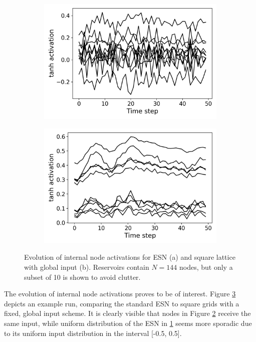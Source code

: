 \begin{figure}[htb]
  \centering
  \begin{subfigure}{.49\textwidth}
    \centering
    \includegraphics[width=1.0\linewidth]{figures/esn-activations.png}
    \caption{}
    \label{fig:activations-a}
  \end{subfigure}
  \begin{subfigure}{.49\textwidth}
    \centering
    \includegraphics[width=1.0\linewidth]{figures/sq-activations.png}
    \caption{}
    \label{fig:activations-b}
  \end{subfigure}
  \caption{
    Evolution of internal node activations for ESN (a) and square lattice with
global input (b). Reservoirs contain $N = 144$ nodes, but only a subset of 10 is
shown to avoid clutter.
  }
  \label{fig:activations}
\end{figure}

The evolution of internal node activations proves to be of interest. Figure
\ref{fig:activations} depicts an example run, comparing the standard ESN to
square grids with a fixed, global input scheme. It is clearly visible that nodes
in Figure \ref{fig:activations-b} receive the same input, while uniform
distribution of the ESN in \ref{fig:activations-a} seems more sporadic due to
its uniform input distribution in the interval [-0.5, 0.5].

